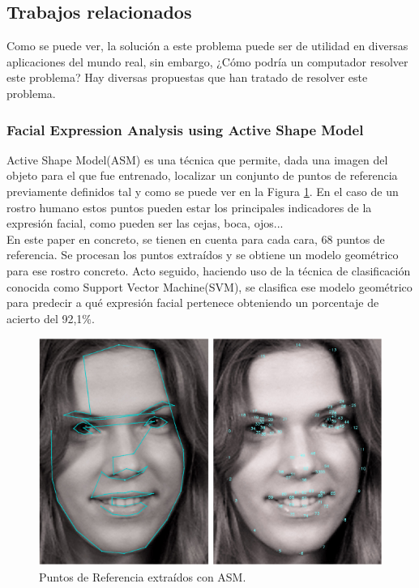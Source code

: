 \documentclass[a4paper,11pt]{book}
\begin{document}
\subsection{Trabajos relacionados}

Como se puede ver, la solución a este problema puede ser de utilidad en diversas aplicaciones del mundo real, sin embargo, ¿Cómo podría un computador resolver este problema? Hay diversas propuestas que han tratado de resolver este problema.

\subsubsection{Facial Expression Analysis using Active Shape Model\cite{shbib_zhou15}}

Active Shape Model(ASM)\cite{cootes_taylor_cooper_graham94} es una técnica que permite, dada una imagen del objeto para el que fue entrenado, localizar un conjunto de puntos de referencia previamente definidos tal y como se puede ver en la Figura \ref{fig:landmarks}. En el caso de un rostro humano estos puntos pueden estar los principales indicadores de la expresión facial, como pueden ser las cejas, boca, ojos...\\
En este paper \cite{shbib_zhou15} en concreto, se tienen en cuenta para cada cara, 68 puntos de referencia. Se procesan los puntos extraídos y se obtiene un modelo geométrico para ese rostro concreto. Acto seguido, haciendo uso de la técnica de clasificación conocida como Support Vector Machine(SVM), se clasifica ese modelo geométrico para predecir a qué expresión facial pertenece obteniendo un porcentaje de acierto del 92,1\%.

\begin{figure}[!]
\centering
\includegraphics[width=0.7\linewidth]{imagenes/landmarks}
\caption[Puntos de Referencia ASM]{Puntos de Referencia extraídos con ASM.}
\label{fig:landmarks}
\end{figure}
\end{document}
